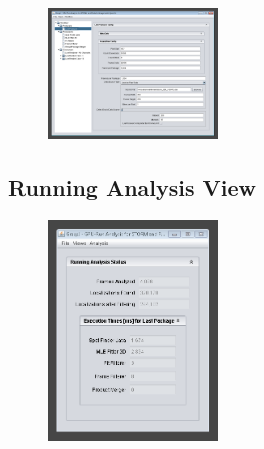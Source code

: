 \documentclass[aspectratio=169]{beamer}
\begin{document}
\begin{frame}
 
 \begin{figure}[h!]
    \centering	\includegraphics[width=0.4\textwidth]{./images/graspj_workflow5.png} 
    \caption{}
    \label{fig:workflow5}
    \end{figure} 
 
\end{frame}

\subsection{Running Analysis View}

\begin{frame}
 
 \begin{figure}[h!]
    \centering	\includegraphics[width=0.4\textwidth]{./images/graspj_running1.png} 
    \caption{}
    \label{fig:running}
    \end{figure} 
 
\end{frame}
\end{document}
